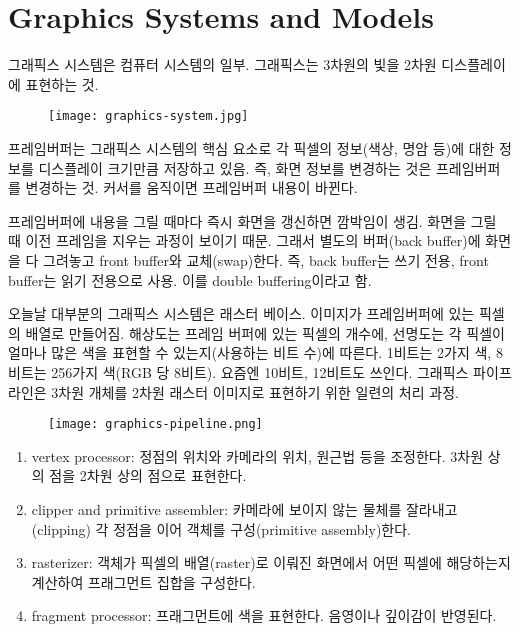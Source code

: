 \section{Graphics Systems and Models}

그래픽스 시스템은 컴퓨터 시스템의 일부. 그래픽스는 3차원의 빛을 2차원 디스플레이에 표현하는 것.

\begin{figure}[h]
  \centering
  \texttt{[image: graphics-system.jpg]}
\end{figure}

프레임버퍼는 그래픽스 시스템의 핵심 요소로 각 픽셀의 정보(색상, 명암 등)에 대한 정보를 디스플레이 크기만큼 저장하고 있음. 즉, 화면 정보를 변경하는 것은 프레임버퍼를 변경하는 것. 커서를 움직이면 프레임버퍼 내용이 바뀐다.

프레임버퍼에 내용을 그릴 때마다 즉시 화면을 갱신하면 깜박임이 생김. 화면을 그릴 때 이전 프레임을 지우는 과정이 보이기 때문. 그래서 별도의 버퍼(back buffer)에 화면을 다 그려놓고 front buffer와 교체(swap)한다. 즉, back buffer는 쓰기 전용, front buffer는 읽기 전용으로 사용. 이를 double buffering이라고 함.

오늘날 대부분의 그래픽스 시스템은 래스터 베이스. 이미지가 프레임버퍼에 있는 픽셀의 배열로 만들어짐. 해상도는 프레임 버퍼에 있는 픽셀의 개수에, 선명도는 각 픽셀이 얼마나 많은 색을 표현할 수 있는지(사용하는 비트 수)에 따른다. 1비트는 2가지 색, 8비트는 256가지 색(RGB 당 8비트). 요즘엔 10비트, 12비트도 쓰인다. 그래픽스 파이프라인은 3차원 개체를 2차원 래스터 이미지로 표현하기 위한 일련의 처리 과정.

\begin{figure}[h]
  \centering
  \texttt{[image: graphics-pipeline.png]}
\end{figure}

\begin{enumerate}
  \item vertex processor: 정점의 위치와 카메라의 위치, 원근법 등을 조정한다. 3차원 상의 점을 2차원 상의 점으로 표현한다.
  \item clipper and primitive assembler: 카메라에 보이지 않는 물체를 잘라내고(clipping) 각 정점을 이어 객체를 구성(primitive assembly)한다.
  \item rasterizer: 객체가 픽셀의 배열(raster)로 이뤄진 화면에서 어떤 픽셀에 해당하는지 계산하여 프래그먼트 집합을 구성한다.
  \item fragment processor: 프래그먼트에 색을 표현한다. 음영이나 깊이감이 반영된다.
\end{enumerate}

